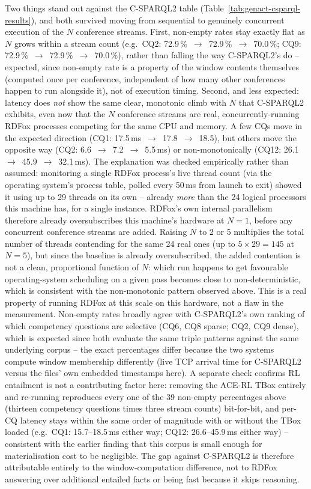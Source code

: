 Two things stand out against the C-SPARQL2 table
(Table~\ref{tab:genact-csparql-results}), and both survived moving from
sequential to genuinely concurrent execution of the $N$ conference streams.
First, non-empty rates stay exactly flat as $N$ grows within a stream count
(e.g.\ CQ2: 72.9\,\%~$\to$~72.9\,\%~$\to$~70.0\,\%; CQ9:
72.9\,\%~$\to$~72.9\,\%~$\to$~70.0\,\%), rather than falling the way
C-SPARQL2's do -- expected, since non-empty rate is a property of the window
contents themselves (computed once per conference, independent of how many
other conferences happen to run alongside it), not of execution timing.
Second, and less expected: latency does \emph{not} show the same clear,
monotonic climb with $N$ that C-SPARQL2 exhibits, even now that the $N$
conference streams are real, concurrently-running RDFox processes competing
for the same CPU and memory. A few CQs move in the expected direction (CQ1:
17.5\,ms~$\to$~17.8~$\to$~18.5), but others move the opposite way (CQ2:
6.6~$\to$~7.2~$\to$~5.5\,ms) or non-monotonically (CQ12: 26.1~$\to$~45.9~$\to$~32.1\,ms).
The explanation was checked empirically rather than assumed: monitoring a
single RDFox process's live thread count (via the operating system's process
table, polled every 50\,ms from launch to exit) showed it using up to 29
threads on its own -- already \emph{more} than the 24 logical processors this
machine has, for a single instance. RDFox's own internal parallelism therefore
already oversubscribes this machine's hardware at $N=1$, before any
concurrent conference streams are added. Raising $N$ to 2 or 5 multiplies the
total number of threads contending for the same 24 real ones (up to
$5\times29=145$ at $N=5$), but since the baseline is already oversubscribed,
the added contention is not a clean, proportional function of $N$: which run
happens to get favourable operating-system scheduling on a given pass becomes
close to non-deterministic, which is consistent with the non-monotonic
pattern observed above. This is a real property of running RDFox at this
scale on this hardware, not a flaw in the measurement. Non-empty rates broadly agree with C-SPARQL2's own ranking of
which competency questions are selective (CQ6, CQ8 sparse; CQ2, CQ9 dense),
which is expected since both evaluate the same triple patterns against the
same underlying corpus -- the exact percentages differ because the two
systems compute window membership differently (live TCP arrival time for
C-SPARQL2 versus the files' own embedded timestamps here). A separate check
confirms RL entailment is not a contributing factor here: removing the ACE-RL
TBox entirely and re-running reproduces every one of the 39 non-empty
percentages above (thirteen competency questions times three stream counts)
bit-for-bit, and per-CQ latency stays within the same order of magnitude with
or without the TBox loaded (e.g.\ CQ1: 15.7--18.5\,ms either way; CQ12:
26.6--45.9\,ms either way) -- consistent with the earlier finding that this
corpus is small enough for materialisation cost to be negligible. The gap
against C-SPARQL2 is therefore attributable entirely to the window-computation
difference, not to RDFox answering over additional entailed facts or being
fast because it skips reasoning.

